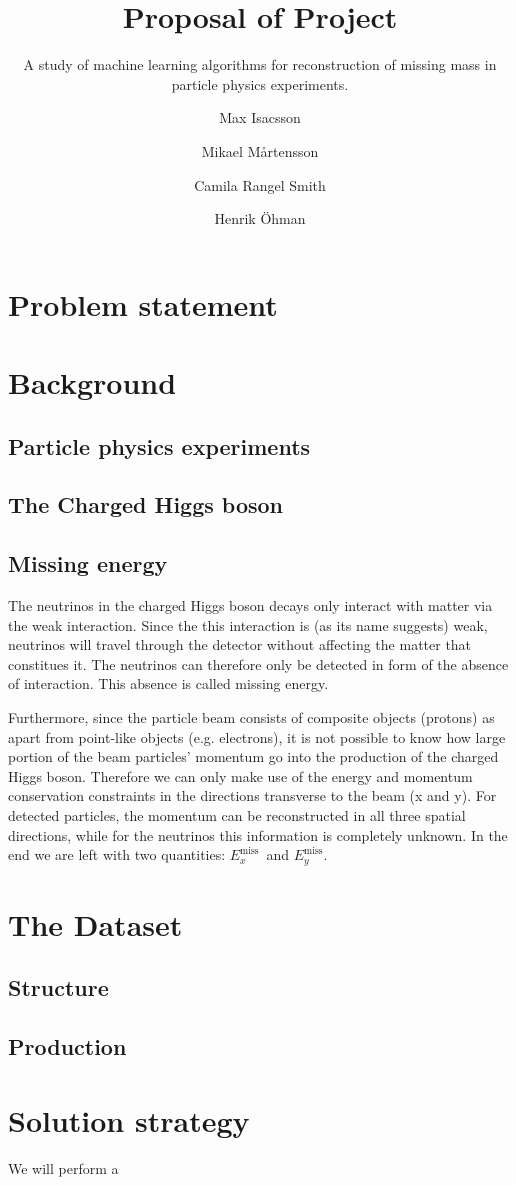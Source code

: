 \documentclass{scrartcl}
\title{Proposal of Project}
\subtitle{A study of machine learning algorithms for reconstruction of missing mass in particle physics experiments.}
\author[1]{Max Isacsson}
\author[2]{Mikael M\aa rtensson}
\author[3]{Camila Rangel Smith}
\author[4]{Henrik \"{O}hman}
\affil[1]{\small\url{max.isacsson@physics.uu.se}}
\affil[2]{\url{mikael.martensson@physics.uu.se}}
\affil[3]{\url{camila.rangel@physics.uu.se}}
\affil[4]{\url{ohman@cern.ch}}
\newcommand{\exmiss}{$E_x^\text{miss}$}
\newcommand{\eymiss}{$E_y^\text{miss}$}
\begin{document}
\maketitle

\section{Problem statement}


\section{Background}
\subsection{Particle physics experiments}

\subsection{The Charged Higgs boson}
\subsection{Missing energy}
The neutrinos in the charged Higgs boson decays only interact with matter via the weak interaction. Since the this interaction is (as its name suggests) weak, neutrinos will travel through the detector without affecting the matter that constitues it. The neutrinos can therefore only be detected in form of the absence of interaction. This absence is called missing energy.

Furthermore, since the particle beam consists of composite objects (protons) as apart from point-like objects (e.g. electrons), it is not possible to know how large portion of the beam particles' momentum go into the production of the charged Higgs boson. Therefore we can only make use of the energy and momentum conservation constraints in the directions transverse to the beam (x and y). For detected particles, the momentum can be reconstructed in all three spatial directions, while for the neutrinos this information is completely unknown. In the end we are left with two quantities: \exmiss\ and \eymiss.

\section{The Dataset}
\subsection{Structure}

\subsection{Production}


\section{Solution strategy}
We will perform a 


% 
\end{document}
